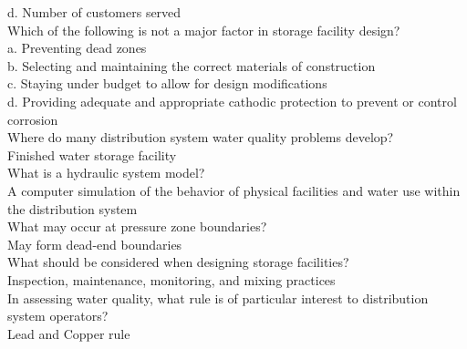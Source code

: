 d.	Number of customers served\\
Which of the following is not a major factor in storage facility design?\\
a.	Preventing dead zones\\
b.	Selecting and maintaining the correct materials of construction\\
c.	Staying under budget to allow for design modifications\\
d.	Providing adequate and appropriate cathodic protection to prevent or control corrosion\\
Where do many distribution system water quality problems develop?\\
Finished water storage facility\\
What is a hydraulic system model?\\
A computer simulation of the behavior of physical facilities and water use within the distribution system\\
What may occur at pressure zone boundaries?\\
May form dead-end boundaries\\
What should be considered when designing storage facilities?\\
Inspection, maintenance, monitoring, and mixing practices\\
In assessing water quality, what rule is of particular interest to distribution system operators?\\
Lead and Copper rule\\
 
